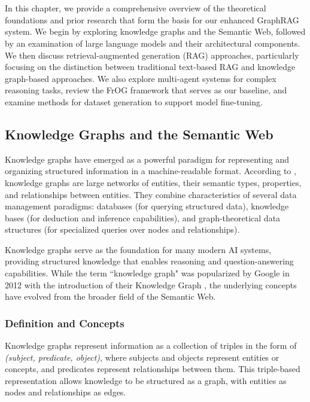 \chapter{\babDua}
\label{bab:2}
In this chapter, we provide a comprehensive overview of the theoretical foundations and prior research that form the basis for our enhanced GraphRAG system. We begin by exploring knowledge graphs and the Semantic Web, followed by an examination of large language models and their architectural components. We then discuss retrieval-augmented generation (RAG) approaches, particularly focusing on the distinction between traditional text-based RAG and knowledge graph-based approaches. We also explore multi-agent systems for complex reasoning tasks, review the FrOG framework that serves as our baseline, and examine methods for dataset generation to support model fine-tuning.

\section{Knowledge Graphs and the Semantic Web}
\label{sec:kg}
Knowledge graphs have emerged as a powerful paradigm for representing and organizing structured information in a machine-readable format. According to \citet{hogan2021knowledge}, knowledge graphs are large networks of entities, their semantic types, properties, and relationships between entities. They combine characteristics of several data management paradigms: databases (for querying structured data), knowledge bases (for deduction and inference capabilities), and graph-theoretical data structures (for specialized queries over nodes and relationships).

Knowledge graphs serve as the foundation for many modern AI systems, providing structured knowledge that enables reasoning and question-answering capabilities. While the term ``knowledge graph" was popularized by Google in 2012 with the introduction of their Knowledge Graph \citep{kg2012}, the underlying concepts have evolved from the broader field of the Semantic Web.

\subsection{Definition and Concepts}
Knowledge graphs represent information as a collection of triples in the form of \textit{(subject, predicate, object)}, where subjects and objects represent entities or concepts, and predicates represent relationships between them. This triple-based representation allows knowledge to be structured as a graph, with entities as nodes and relationships as edges.

